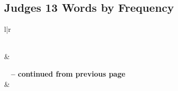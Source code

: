 




\subsection{Judges 13 Words by Frequency}


\normalsize
 
\begin{center}
\begin{longtable}{l|r}
\caption[Judges 13 Words by Frequency]{Judges 13 Words by Frequency}\label{table:WordsbyFrequency for Judges 13} \\
\hline {} &  \\ \hline 
\endfirsthead
 
{{\bfseries \tablename\ \thetable{} -- continued from previous page}} \\  
\hline {} &  \\ \hline 
\endhead
 

\end{longtable}
\end{center}

